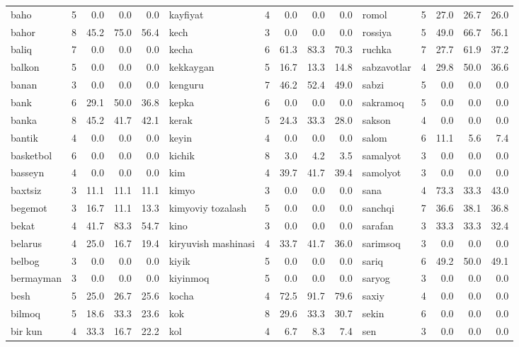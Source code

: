 \documentclass[a4paper,10pt]{article}
\begin{document}
\begin{longtable}{lrrrr|lrrrr|lrrrr}
baho & 5 & 0.0 & 0.0 & 0.0 & kayfiyat & 4 & 0.0 & 0.0 & 0.0 & ro\textquotesingle{}mol & 5 & 27.0 & 26.7 & 26.0 \\
bahor & 8 & 45.2 & 75.0 & 56.4 & kech & 3 & 0.0 & 0.0 & 0.0 & rossiya & 5 & 49.0 & 66.7 & 56.1 \\
baliq & 7 & 0.0 & 0.0 & 0.0 & kecha & 6 & 61.3 & 83.3 & 70.3 & ruchka & 7 & 27.7 & 61.9 & 37.2 \\
balkon & 5 & 0.0 & 0.0 & 0.0 & kekkaygan & 5 & 16.7 & 13.3 & 14.8 & sabzavotlar & 4 & 29.8 & 50.0 & 36.6 \\
banan & 3 & 0.0 & 0.0 & 0.0 & kenguru & 7 & 46.2 & 52.4 & 49.0 & sabzi & 5 & 0.0 & 0.0 & 0.0 \\
bank & 6 & 29.1 & 50.0 & 36.8 & kepka & 6 & 0.0 & 0.0 & 0.0 & sakramoq & 5 & 0.0 & 0.0 & 0.0 \\
banka & 8 & 45.2 & 41.7 & 42.1 & kerak & 5 & 24.3 & 33.3 & 28.0 & sakson & 4 & 0.0 & 0.0 & 0.0 \\
bantik & 4 & 0.0 & 0.0 & 0.0 & keyin & 4 & 0.0 & 0.0 & 0.0 & salom & 6 & 11.1 & 5.6 & 7.4 \\
basketbol & 6 & 0.0 & 0.0 & 0.0 & kichik & 8 & 3.0 & 4.2 & 3.5 & samalyot & 3 & 0.0 & 0.0 & 0.0 \\
basseyn & 4 & 0.0 & 0.0 & 0.0 & kim & 4 & 39.7 & 41.7 & 39.4 & samolyot & 3 & 0.0 & 0.0 & 0.0 \\
baxtsiz & 3 & 11.1 & 11.1 & 11.1 & kimyo & 3 & 0.0 & 0.0 & 0.0 & sana & 4 & 73.3 & 33.3 & 43.0 \\
begemot & 3 & 16.7 & 11.1 & 13.3 & kimyoviy tozalash & 5 & 0.0 & 0.0 & 0.0 & sanchqi & 7 & 36.6 & 38.1 & 36.8 \\
bekat & 4 & 41.7 & 83.3 & 54.7 & kino & 3 & 0.0 & 0.0 & 0.0 & sarafan & 3 & 33.3 & 33.3 & 32.4 \\
belarus & 4 & 25.0 & 16.7 & 19.4 & kiryuvish mashinasi & 4 & 33.7 & 41.7 & 36.0 & sarimsoq & 3 & 0.0 & 0.0 & 0.0 \\
belbog & 3 & 0.0 & 0.0 & 0.0 & kiyik & 5 & 0.0 & 0.0 & 0.0 & sariq & 6 & 49.2 & 50.0 & 49.1 \\
bermayman & 3 & 0.0 & 0.0 & 0.0 & kiyinmoq & 5 & 0.0 & 0.0 & 0.0 & saryog & 3 & 0.0 & 0.0 & 0.0 \\
besh & 5 & 25.0 & 26.7 & 25.6 & ko\textquotesingle{}cha & 4 & 72.5 & 91.7 & 79.6 & saxiy & 4 & 0.0 & 0.0 & 0.0 \\
bilmoq & 5 & 18.6 & 33.3 & 23.6 & ko\textquotesingle{}k & 8 & 29.6 & 33.3 & 30.7 & sekin & 6 & 0.0 & 0.0 & 0.0 \\
bir kun & 4 & 33.3 & 16.7 & 22.2 & ko\textquotesingle{}l & 4 & 6.7 & 8.3 & 7.4 & sen & 3 & 0.0 & 0.0 & 0.0 \\

\end{longtable}
\end{document}
